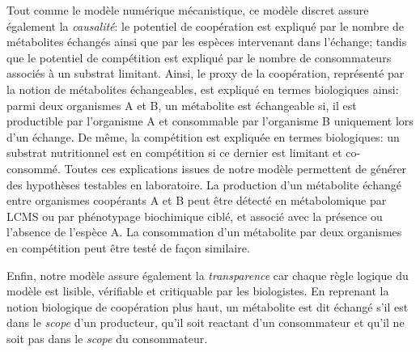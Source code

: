 \documentclass[../main.tex]{subfiles}
\begin{document}
Tout comme le modèle numérique mécanistique, ce modèle discret assure également la \textit{causalité}: le potentiel de coopération est expliqué par le nombre de métabolites échangés ainsi que par les espèces intervenant dans l'échange; tandis que le potentiel de compétition est expliqué par le nombre de consommateurs associés à un substrat limitant. Ainsi, le proxy de la coopération, représenté par la notion de métabolites échangeables, est expliqué en termes biologiques ainsi: parmi deux organismes A et B, un métabolite est échangeable si, il est productible par l'organisme A et consommable par l'organisme B uniquement lors d'un échange.
De même, la compétition est expliquée en termes biologiques: un substrat nutritionnel est en compétition si ce dernier est limitant et co-consommé. Toutes ces explications issues de notre modèle permettent de générer des hypothèses testables en laboratoire.
La production d'un métabolite échangé entre organismes coopérants A et B peut être détecté en métabolomique par LCMS ou par phénotypage biochimique ciblé, et associé avec la présence ou l'absence de l'espèce A.
La consommation d'un métabolite par deux organismes en compétition peut être testé de façon similaire.

Enfin, notre modèle assure également la \textit{transparence} car chaque règle logique du modèle est lisible, vérifiable et critiquable par les biologistes. En reprenant la notion biologique de coopération plus haut, un métabolite est dit échangé s'il est dans le \textit{scope} d'un producteur, qu'il soit reactant d'un consommateur et qu'il ne soit pas dans le \textit{scope} du consommateur.

\end{document}
